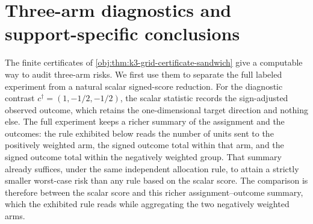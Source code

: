 \section{Three-arm diagnostics and support-specific conclusions}\label{sec:threearm}

The finite certificates of \cref{obj:thm:k3-grid-certificate-sandwich} give a computable way to audit three-arm risks. We first use them to separate the full labeled experiment from a natural scalar signed-score reduction. For the diagnostic contrast \(c^\dagger=(1,-1/2,-1/2)\), the scalar statistic records the sign-adjusted observed outcome, which retains the one-dimensional target direction and nothing else. The full experiment keeps a richer summary of the assignment and the outcomes: the rule exhibited below reads the number of units sent to the positively weighted arm, the signed outcome total within that arm, and the signed outcome total within the negatively weighted group. That summary already suffices, under the same independent allocation rule, to attain a strictly smaller worst-case risk than any rule based on the scalar score. The comparison is therefore between the scalar score and this richer assignment--outcome summary, which the exhibited rule reads while aggregating the two negatively weighted arms.


